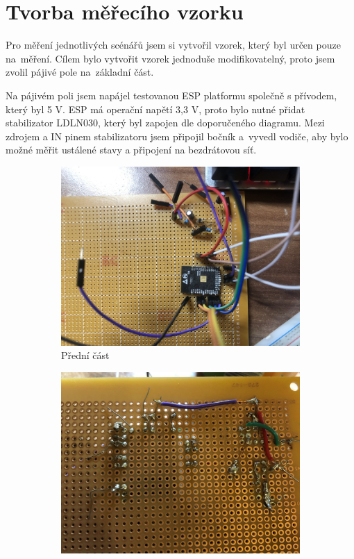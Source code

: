 \documentclass[a4paper, 12pt]{report}
\begin{document}
    \section{Tvorba měřecího vzorku}
    Pro měření jednotlivých scénářů jsem si vytvořil vzorek, který byl určen pouze na~měření.
    Cílem bylo vytvořit vzorek jednoduše modifikovatelný, proto jsem zvolil pájivé pole na~základní část.\par
    Na pájivém poli jsem napájel testovanou ESP platformu společně s přívodem, který byl 5 V. ESP má operační napětí 3,3 V, proto bylo nutné přidat stabilizator LDLN030, který byl zapojen dle doporučeného diagramu.
    Mezi zdrojem a IN pinem stabilizatoru jsem připojil bočník a~vyvedl vodiče, aby bylo možné měřit ustálené stavy a připojení na bezdrátovou síť.
    \begin{figure}[h!]
        \centering
        \begin{subfigure}[b]{0.4\linewidth}
            \includegraphics[width=\linewidth]{images/zapojeni_esp32_vzorek}
            \caption{Přední část}
        \end{subfigure}
        \begin{subfigure}[b]{0.4\linewidth}
            \includegraphics[width=\linewidth]{images/zapojeni_esp32_vzorek_zadek}

\end{subfigure}
\end{figure}
\end{document}
